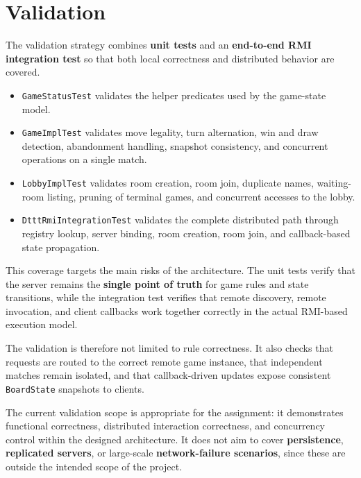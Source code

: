 \clearpage
\section{Validation}

The validation strategy combines \textbf{unit tests} and an
\textbf{end-to-end RMI integration test} so that both local correctness and
distributed behavior are covered.

\begin{itemize}
    \item \texttt{GameStatusTest} validates the helper predicates used by the
    game-state model.
    \item \texttt{GameImplTest} validates move legality, turn alternation, win
    and draw detection, abandonment handling, snapshot consistency, and
    concurrent operations on a single match.
    \item \texttt{LobbyImplTest} validates room creation, room join, duplicate
    names, waiting-room listing, pruning of terminal games, and concurrent
    accesses to the lobby.
    \item \texttt{DtttRmiIntegrationTest} validates the complete distributed
    path through registry lookup, server binding, room creation, room join, and
    callback-based state propagation.
\end{itemize}

This coverage targets the main risks of the architecture. The unit tests verify
that the server remains the \textbf{single point of truth} for game rules and
state transitions, while the integration test verifies that remote discovery,
remote invocation, and client callbacks work together correctly in the actual
RMI-based execution model.

The validation is therefore not limited to rule correctness. It also checks
that requests are routed to the correct remote game instance, that independent
matches remain isolated, and that callback-driven updates expose consistent
\texttt{BoardState} snapshots to clients.

The current validation scope is appropriate for the assignment: it demonstrates
functional correctness, distributed interaction correctness, and concurrency
control within the designed architecture. It does not aim to cover
\textbf{persistence}, \textbf{replicated servers}, or large-scale
\textbf{network-failure scenarios}, since these are outside the intended scope
of the project.
